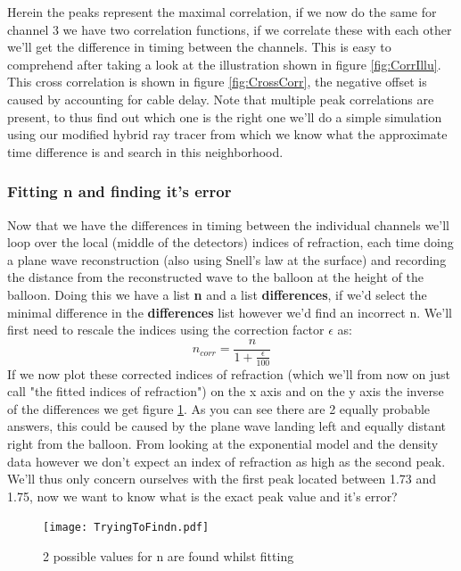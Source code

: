 Herein the peaks represent the maximal correlation, if we now do the same for
channel 3 we have two correlation functions, if we correlate these with
each other we'll get the difference in timing between the channels.  This is
easy to comprehend after taking a look at the illustration shown in figure
\ref{fig:CorrIllu}. This cross correlation is shown in figure
\ref{fig:CrossCorr}, the negative offset is caused by accounting for cable
delay. Note that multiple peak correlations are present, to thus find out which
one is the right one we'll do a simple simulation using our modified hybrid ray
tracer from which we know what the approximate time difference is and search in
this neighborhood.

\subsubsection{Fitting n and finding it's error}
Now that we have the differences in timing between the individual channels we'll loop
over the local (middle of the detectors) indices of refraction, each time doing a plane
wave reconstruction (also using Snell's law at the surface) and recording the distance
from the reconstructed wave to the balloon at the height of the balloon.
Doing this we have a list \textbf{n} and a list \textbf{differences}, if we'd select
the minimal difference in the \textbf{differences} list however we'd find an incorrect
n. We'll first need to rescale the indices using the correction factor $\epsilon$ as:
\begin{equation}
	n_{corr} = \frac{n}{1+\frac{\epsilon}{100}}
\end{equation}
If we now plot these corrected indices of refraction (which we'll from now on
just call "the fitted indices of refraction") on the x axis and on the y axis
the inverse of the differences we get figure \ref{fig:2PeakFit}. As you can
see there are 2 equally probable answers, this could be caused by the plane
wave landing left and equally distant right from the balloon. From looking at
the exponential model and the density data however we don't expect an index of
refraction as high as the second peak. We'll thus only concern ourselves with
the first peak located between 1.73 and 1.75, now we want to know what is the
exact peak value and it's error?
\begin{figure}
	\centering
	\texttt{[image: TryingToFindn.pdf]}
	\caption{2 possible values for n are found whilst fitting}
	\label{fig:2PeakFit}
\end{figure}

